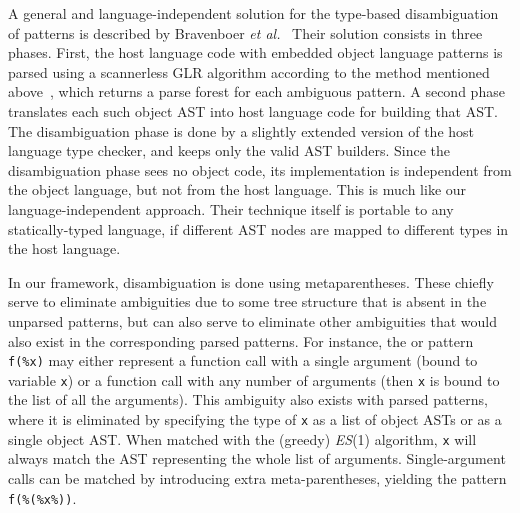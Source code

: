 A general and language\hyp{}independent solution for the
type\hyp{}based disambiguation of patterns is described by Bravenboer
\emph{et al.}~\cite{type-disambig} Their solution consists in three
phases. First, the host language code with embedded object language
patterns is parsed using a scannerless GLR algorithm according to the
method mentioned above~\cite{metaprog}, which returns a parse forest
for each ambiguous pattern. A second phase translates each such object
AST into host language code for building that AST. The disambiguation
phase is done by a slightly extended version of the host language type
checker, and keeps only the valid AST builders. Since the
disambiguation phase sees no object code, its implementation is
independent from the object language, but not from the host
language. This is much like our language\hyp{}independent
approach. Their technique itself is portable to any
statically\hyp{}typed language, if different AST nodes are mapped to
different types in the host language.

In our framework, disambiguation is done using
meta\-parentheses. These chiefly serve to eliminate ambiguities due to
some tree structure that is absent in the unparsed patterns, but can
also serve to eliminate other ambiguities that would also exist in the
corresponding parsed patterns. For instance, the \Clang or \Java
pattern \texttt{f(\%x)} may either represent a function call with a
single argument (bound to variable \texttt{x}) or a function call with
any number of arguments (then \texttt{x} is bound to the list of all
the arguments). This ambiguity also exists with parsed patterns, where
it is eliminated by specifying the type of \texttt{x} as a list of
object ASTs or as a single object AST. When matched with the (greedy)
\textit{ES}(1) algorithm, \texttt{x} will always match the AST
representing the whole list of arguments.  Single\hyp{}argument calls
can be matched by introducing extra meta-parentheses, yielding the
pattern \texttt{f(\%(\%x\%))}.
